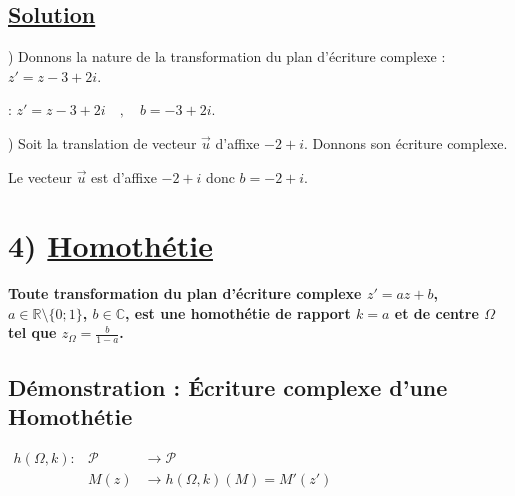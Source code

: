 \documentclass[12pt,a4paper]{article}
\begin{document}
\subsection*{ \underline{Solution}}

\vspace{1em}

) Donnons la nature de la transformation du plan d'écriture complexe : $z' = z - 3 + 2i$.

\noindent : $z' = z - 3 + 2i \quad , \quad b = -3 + 2i$.

\vspace{1em}

\noindent {}

\vspace{1em}

) Soit la translation de vecteur $\vec{u}$ d'affixe $-2 + i$. Donnons son écriture complexe.

\noindent Le vecteur $\vec{u}$ est d'affixe $-2 + i$ donc $b = -2 + i$.

\vspace{1em}

\noindent {}

\section*{4) \underline{Homothétie}}

\noindent \textbf{Toute transformation du plan d'écriture complexe $z' = az + b$, $a \in \mathbb{R} \setminus \{0; 1\}$, $b \in \mathbb{C}$, est une homothétie de rapport $k = a$ et de centre $\Omega$ tel que $z_{\Omega} = \frac{b}{1 - a}$.}

\vspace{1em}

\subsection*{Démonstration : Écriture complexe d'une Homothétie}

\begin{center}
$
\begin{aligned}
h(\Omega, k) :& \mathcal{P}& \to \mathcal{P} \\
&M(z)& \to h(\Omega, k)(M) = M'(z')
\end{aligned}
$
\end{center}
\end{document}
